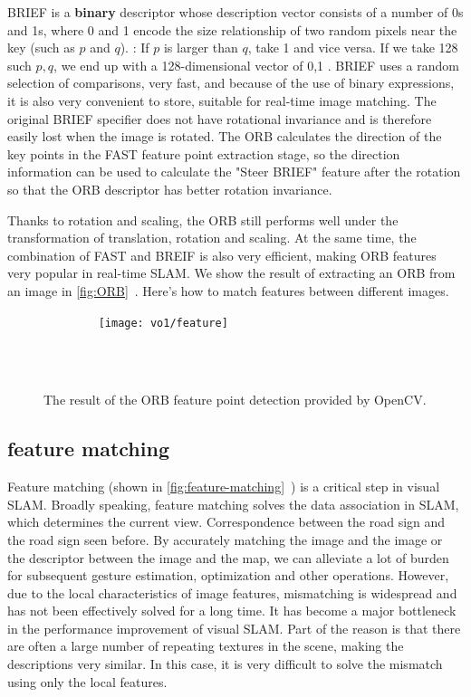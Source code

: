 BRIEF is a \textbf{binary} descriptor whose description vector consists of a number of 0s and 1s, where 0 and 1 encode the size relationship of two random pixels near the key (such as $p$ and $q$). : If $p$ is larger than $q$, take 1 and vice versa. If we take 128 such $p,q$, we end up with a 128-dimensional vector of 0,1 \textsuperscript{\cite{calonder2010brief}}. BRIEF uses a random selection of comparisons, very fast, and because of the use of binary expressions, it is also very convenient to store, suitable for real-time image matching. The original BRIEF specifier does not have rotational invariance and is therefore easily lost when the image is rotated. The ORB calculates the direction of the key points in the FAST feature point extraction stage, so the direction information can be used to calculate the "Steer BRIEF" feature after the rotation so that the ORB descriptor has better rotation invariance.

Thanks to rotation and scaling, the ORB still performs well under the transformation of translation, rotation and scaling. At the same time, the combination of FAST and BREIF is also very efficient, making ORB features very popular in real-time SLAM. We show the result of extracting an ORB from an image in \autoref{fig:ORB}~. Here's how to match features between different images.

\begin{figure}[!htp]
    \centering
    \texttt{[image: vo1/feature]}\\
    \caption{The result of the ORB feature point detection provided by OpenCV. }
    \label{fig:ORB}
\end{figure}

\subsection{feature matching}

Feature matching (shown in \autoref{fig:feature-matching}~) is a critical step in visual SLAM. Broadly speaking, feature matching solves the data association in SLAM, which determines the current view. Correspondence between the road sign and the road sign seen before. By accurately matching the image and the image or the descriptor between the image and the map, we can alleviate a lot of burden for subsequent gesture estimation, optimization and other operations. However, due to the local characteristics of image features, mismatching is widespread and has not been effectively solved for a long time. It has become a major bottleneck in the performance improvement of visual SLAM. Part of the reason is that there are often a large number of repeating textures in the scene, making the descriptions very similar. In this case, it is very difficult to solve the mismatch using only the local features.

